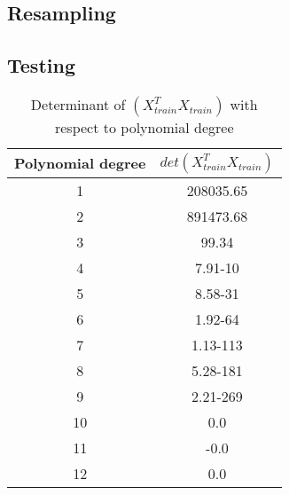 \subsection{Resampling}



\subsection{Testing}
\begin{table}
    \centering
    \caption{Determinant of $(X^T_{train}X_{train})$ with respect to polynomial
    degree}  
    \begin{tabular}{|c|c|}
        \hline
        Polynomial degree & $det(X_{train}^T X_{train})$  \\
        \hline
        1 & 208035.65\\
        \hline
        2 & 891473.68\\
        \hline
        3 & 99.34\\
        \hline
        4 & 7.91-10 \\
        \hline
        5 & 8.58-31 \\
        \hline
        6 & 1.92-64 \\
        \hline
        7 & 1.13-113 \\
        \hline
        8 & 5.28-181 \\
        \hline
        9 & 2.21-269 \\
        \hline
        10 & 0.0 \\
        \hline
        11 & -0.0 \\
        \hline
        12 & 0.0 \\
        \hline
         
    \end{tabular} 
\end{table}




